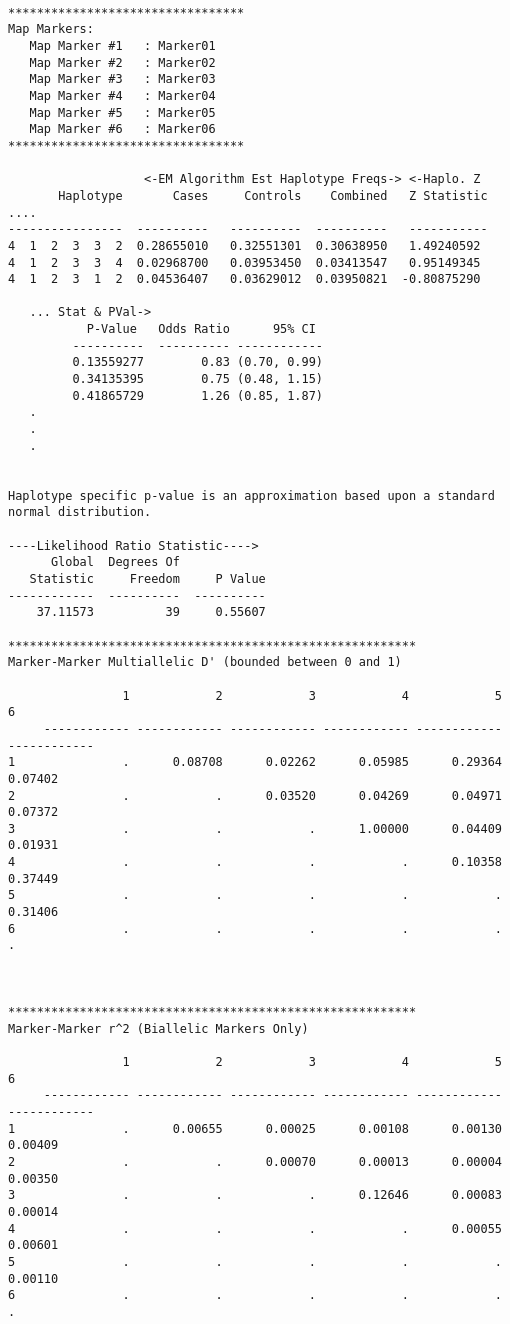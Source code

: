 \begin{verbatim}

*********************************
Map Markers: 
   Map Marker #1   : Marker01
   Map Marker #2   : Marker02
   Map Marker #3   : Marker03
   Map Marker #4   : Marker04
   Map Marker #5   : Marker05
   Map Marker #6   : Marker06
*********************************

                   <-EM Algorithm Est Haplotype Freqs-> <-Haplo. Z 
       Haplotype       Cases     Controls    Combined   Z Statistic ....
----------------  ----------   ----------  ----------   -----------
4  1  2  3  3  2  0.28655010   0.32551301  0.30638950   1.49240592 
4  1  2  3  3  4  0.02968700   0.03953450  0.03413547   0.95149345 
4  1  2  3  1  2  0.04536407   0.03629012  0.03950821  -0.80875290 

   ... Stat & PVal->                        
           P-Value   Odds Ratio      95% CI 
         ----------  ---------- ------------
         0.13559277        0.83 (0.70, 0.99)
         0.34135395        0.75 (0.48, 1.15)
         0.41865729        1.26 (0.85, 1.87)
   .
   .
   .


Haplotype specific p-value is an approximation based upon a standard normal distribution.

----Likelihood Ratio Statistic---->
      Global  Degrees Of            
   Statistic     Freedom     P Value
------------  ----------  ----------
    37.11573          39     0.55607

*********************************************************
Marker-Marker Multiallelic D' (bounded between 0 and 1)

                1            2            3            4            5            6
     ------------ ------------ ------------ ------------ ------------ ------------
1               .      0.08708      0.02262      0.05985      0.29364      0.07402
2               .            .      0.03520      0.04269      0.04971      0.07372
3               .            .            .      1.00000      0.04409      0.01931
4               .            .            .            .      0.10358      0.37449
5               .            .            .            .            .      0.31406
6               .            .            .            .            .            .



*********************************************************
Marker-Marker r^2 (Biallelic Markers Only)

                1            2            3            4            5            6
     ------------ ------------ ------------ ------------ ------------ ------------
1               .      0.00655      0.00025      0.00108      0.00130      0.00409
2               .            .      0.00070      0.00013      0.00004      0.00350
3               .            .            .      0.12646      0.00083      0.00014
4               .            .            .            .      0.00055      0.00601
5               .            .            .            .            .      0.00110
6               .            .            .            .            .            .
\end{verbatim}

